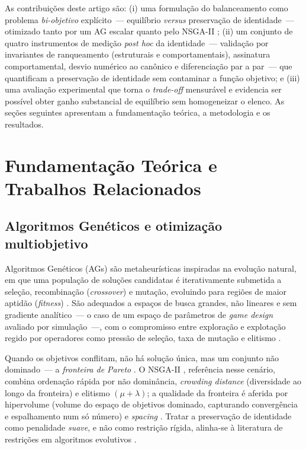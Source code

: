 \documentclass[12pt]{article}
\begin{document}
As contribuições deste artigo são: (i) uma formulação do balanceamento como
problema \emph{bi-objetivo} explícito~--- equilíbrio \emph{versus} preservação de
identidade~--- otimizado tanto por um AG escalar quanto pelo NSGA-II
\cite{deb2002nsga}; (ii) um conjunto de quatro instrumentos de medição
\emph{post hoc} da identidade~--- validação por invariantes de ranqueamento
(estruturais e comportamentais), assinatura comportamental, desvio numérico ao
canônico e diferenciação par a par~--- que quantificam a preservação de identidade
sem contaminar a função objetivo; e (iii) uma avaliação experimental que torna o
\emph{trade-off} mensurável e evidencia ser possível obter ganho substancial de
equilíbrio sem homogeneizar o elenco. As seções seguintes apresentam a
fundamentação teórica, a metodologia e os resultados.

\section{Fundamentação Teórica e Trabalhos Relacionados}

\subsection{Algoritmos Genéticos e otimização multiobjetivo}

Algoritmos Genéticos (AGs) são metaheurísticas inspiradas na evolução natural, em
que uma população de soluções candidatas é iterativamente submetida a seleção,
recombinação (\emph{crossover}) e mutação, evoluindo para regiões de maior aptidão
(\emph{fitness}) \cite{holland1975adaptation,goldberg1989genetic,mitchell1998introduction}.
São adequados a espaços de busca grandes, não lineares e sem gradiente analítico~---
o caso de um espaço de parâmetros de \emph{game design} avaliado por simulação~---,
com o compromisso entre exploração e explotação regido por operadores como pressão
de seleção, taxa de mutação e elitismo
\cite{whitley1994tutorial,eiben1998exploration,eiben2015introduction}.

Quando os objetivos conflitam, não há solução única, mas um conjunto não dominado~---
a \emph{fronteira de Pareto} \cite{deb2001multiobjective}. O NSGA-II
\cite{deb2002nsga}, referência nesse cenário, combina ordenação rápida por não
dominância, \emph{crowding distance} (diversidade ao longo da fronteira) e elitismo
$(\mu+\lambda)$; a qualidade da fronteira é aferida por hipervolume (volume do
espaço de objetivos dominado, capturando convergência e espalhamento num só número)
e \emph{spacing} \cite{deb2001multiobjective,deb2002nsga}. Tratar a preservação de
identidade como penalidade \emph{suave}, e não como restrição rígida, alinha-se à
literatura de restrições em algoritmos evolutivos \cite{michalewicz1996constrained}.
\end{document}
